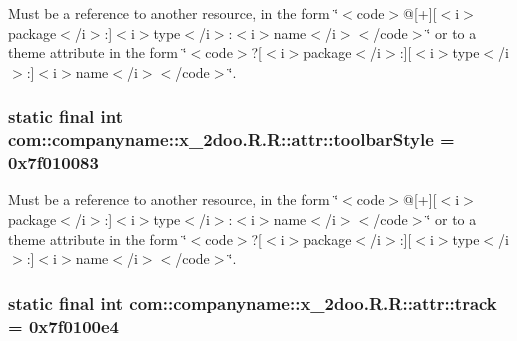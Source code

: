 Must be a reference to another resource, in the form \char`\"{}$<$code$>$@\mbox{[}+\mbox{]}\mbox{[}$<$i$>$package$<$/i$>$:\mbox{]}$<$i$>$type$<$/i$>$:$<$i$>$name$<$/i$>$$<$/code$>$\char`\"{} or to a theme attribute in the form \char`\"{}$<$code$>$?\mbox{[}$<$i$>$package$<$/i$>$:\mbox{]}\mbox{[}$<$i$>$type$<$/i$>$:\mbox{]}$<$i$>$name$<$/i$>$$<$/code$>$\char`\"{}. \hypertarget{classcom_1_1companyname_1_1x__2doo_1_1_r_1_1attr_d37e97fa29025fc2ba46df7d6e0a01ec}{
\subsubsection[{toolbarStyle}]{\setlength{\rightskip}{0pt plus 5cm}static final int com::companyname::x\_\-2doo.R.R::attr::toolbarStyle = 0x7f010083}}
\label{classcom_1_1companyname_1_1x__2doo_1_1_r_1_1attr_d37e97fa29025fc2ba46df7d6e0a01ec}


Must be a reference to another resource, in the form \char`\"{}$<$code$>$@\mbox{[}+\mbox{]}\mbox{[}$<$i$>$package$<$/i$>$:\mbox{]}$<$i$>$type$<$/i$>$:$<$i$>$name$<$/i$>$$<$/code$>$\char`\"{} or to a theme attribute in the form \char`\"{}$<$code$>$?\mbox{[}$<$i$>$package$<$/i$>$:\mbox{]}\mbox{[}$<$i$>$type$<$/i$>$:\mbox{]}$<$i$>$name$<$/i$>$$<$/code$>$\char`\"{}. \hypertarget{classcom_1_1companyname_1_1x__2doo_1_1_r_1_1attr_b09ab26417791942037d9beb93718a25}{
\subsubsection[{track}]{\setlength{\rightskip}{0pt plus 5cm}static final int com::companyname::x\_\-2doo.R.R::attr::track = 0x7f0100e4}}
\label{classcom_1_1companyname_1_1x__2doo_1_1_r_1_1attr_b09ab26417791942037d9beb93718a25}


